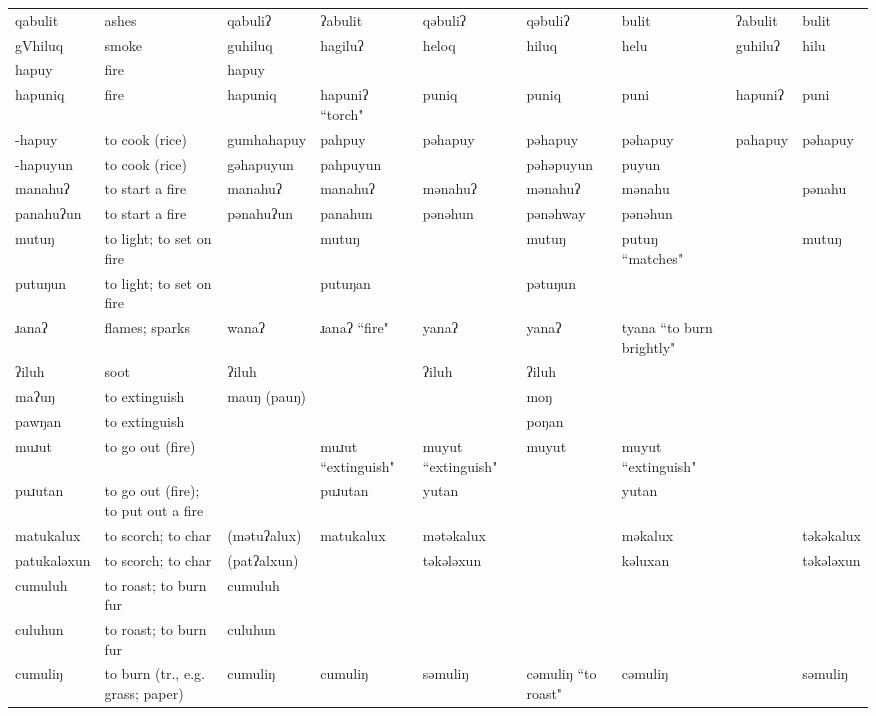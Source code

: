 \begin{landscape}
\begin{longtable}{*{9}{p{}}}
\text{*}qabulit & ashes & qabuliʔ & ʔabulit & qəbuliʔ & qəbuliʔ & bulit & ʔabulit & bulit\\
\text{*}gVhiluq & smoke & guhiluq & hagiluʔ & heloq & hiluq & helu & guhiluʔ & hilu\\
\text{*}hapuy & fire & hapuy &  &  &  &  &  & \\
\text{*}hapuniq & fire & hapuniq & hapuniʔ ``torch" & puniq & puniq & puni & hapuniʔ & puni\\
\text{*}-hapuy & to cook (rice) & gumhahapuy & pahpuy & pəhapuy & pəhapuy & pəhapuy & pahapuy & pəhapuy\\
\text{*}-hapuyun & to cook (rice) & gəhapuyun & pahpuyun &  & pəhəpuyun & puyun &  & \\
\text{*}manahuʔ & to start a fire & manahuʔ & manahuʔ & mənahuʔ & mənahuʔ & mənahu &  & pənahu\\
\text{*}panahuʔun & to start a fire & pənahuʔun & panahun & pənəhun & pənəhway & pənəhun &  & \\
\text{*}mutuŋ & to light; to set on fire &  & mutuŋ &  & mutuŋ & putuŋ ``matches" &  & mutuŋ\\
\text{*}putuŋun & to light; to set on fire &  & putuŋan &  & pətuŋun &  &  & \\
\text{*}ɹanaʔ & flames; sparks & wanaʔ & ɹanaʔ ``fire" & yanaʔ & yanaʔ & tyana ``to burn brightly" &  & \\
\text{*}ʔiluh & soot & ʔiluh &  & ʔiluh & ʔiluh &  &  & \\
\text{*}maʔuŋ & to extinguish & mauŋ (pauŋ) &  &  & moŋ &  &  & \\
\text{*}pawŋan & to extinguish &  &  &  & poŋan &  &  & \\
\text{*}muɹut & to go out (fire) &  & muɹut ``extinguish" & muyut ``extinguish" & muyut & muyut ``extinguish" &  & \\
\text{*}puɹutan & to go out (fire); to put out a fire &  & puɹutan & yutan &  & yutan &  & \\
\text{*}matukalux & to scorch; to char & (mətuʔalux) & matukalux & mətəkalux &  & məkalux &  & təkəkalux\\
\text{*}patukaləxun & to scorch; to char & (patʔalxun) &  & təkələxun &  & kəluxan &  & təkələxun\\
\text{*}cumuluh & to roast; to burn fur & cumuluh &  &  &  &  &  & \\
\text{*}culuhun & to roast; to burn fur & culuhun &  &  &  &  &  & \\
\text{*}cumuliŋ & to burn (tr., e.g. grass; paper) & cumuliŋ & cumuliŋ & səmuliŋ & cəmuliŋ ``to roast" & cəmuliŋ &  & səmuliŋ\\

\end{longtable}
\end{landscape}
